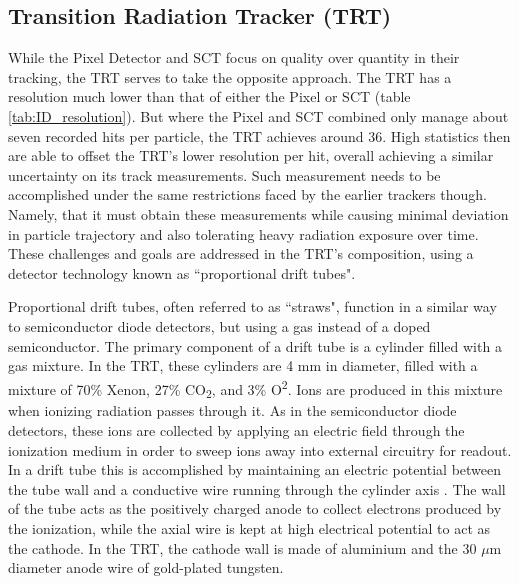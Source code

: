     \subsection{Transition Radiation Tracker (TRT)}
            While the Pixel Detector and SCT focus on quality over quantity in their tracking, the TRT serves to take the opposite approach.
            The TRT has a resolution much lower than that of either the Pixel or SCT (table \ref{tab:ID_resolution}).
            But where the Pixel and SCT combined only manage about seven recorded hits per particle, the TRT achieves around 36.
            High statistics then are able to offset the TRT's lower resolution per hit, overall achieving a similar uncertainty on its track measurements.
            Such measurement needs to be accomplished under the same restrictions faced by the earlier trackers though.
            Namely, that it must obtain these measurements while causing minimal deviation in particle trajectory and also tolerating heavy radiation exposure over time.
            These challenges and goals are addressed in the TRT's composition, using a detector technology known as ``proportional drift tubes".

            Proportional drift tubes, often referred to as ``straws", function in a similar way to semiconductor diode detectors, but using a gas instead of a doped semiconductor.
            The primary component of a drift tube is a cylinder filled with a gas mixture.
            In the TRT, these cylinders are 4 mm in diameter, filled with a mixture of 70\% Xenon, 27\% CO\textsubscript{2}, and 3\% O\textsuperscript{2}.
            Ions are produced in this mixture when ionizing radiation passes through it.
            As in the semiconductor diode detectors, these ions are collected by applying an electric field through the ionization medium in order to sweep ions away into external circuitry for readout.
            In a drift tube this is accomplished by maintaining an electric potential between the tube wall and a conductive wire running through the cylinder axis \cite{drift_chambers}.
            The wall of the tube acts as the positively charged anode to collect electrons produced by the ionization, while the axial wire is kept at high electrical potential to act as the cathode.
            In the TRT, the cathode wall is made of aluminium and the 30 $\mu$m diameter anode wire of gold-plated tungsten. \cite{trt_design}

